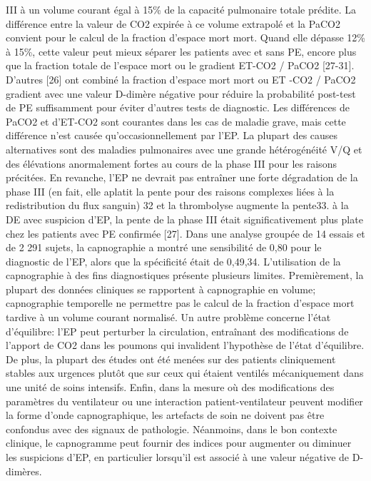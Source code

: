 \documentclass[12pt,]{article}
\begin{document}
\begin{itemize}
  III à un volume courant égal à 15\% de la capacité pulmonaire totale
  prédite. La différence entre la valeur de CO2 expirée à ce volume
  extrapolé et la PaCO2 convient pour le calcul de la fraction d'espace
  mort mort. Quand elle dépasse 12\% à 15\%, cette valeur peut mieux
  séparer les patients avec et sans PE, encore plus que la fraction
  totale de l'espace mort ou le gradient ET-CO2 / PaCO2 {[}27-31{]}.
  D'autres {[}26{]} ont combiné la fraction d'espace mort mort ou ET
  -CO2 / PaCO2 gradient avec une valeur D-dimère négative pour réduire
  la probabilité post-test de PE suffisamment pour éviter d'autres tests
  de diagnostic. Les différences de PaCO2 et d'ET-CO2 sont courantes
  dans les cas de maladie grave, mais cette différence n'est causée
  qu'occasionnellement par l'EP. La plupart des causes alternatives sont
  des maladies pulmonaires avec une grande hétérogénéité V/Q et des
  élévations anormalement fortes au cours de la phase III pour les
  raisons précitées. En revanche, l'EP ne devrait pas entraîner une
  forte dégradation de la phase III (en fait, elle aplatit la pente pour
  des raisons complexes liées à la redistribution du flux sanguin) 32 et
  la thrombolyse augmente la pente33. à la DE avec suspicion d'EP, la
  pente de la phase III était significativement plus plate chez les
  patients avec PE confirmée {[}27{]}. Dans une analyse groupée de 14
  essais et de 2 291 sujets, la capnographie a montré une sensibilité de
  0,80 pour le diagnostic de l'EP, alors que la spécificité était de
  0,49,34. L'utilisation de la capnographie à des fins diagnostiques
  présente plusieurs limites. Premièrement, la plupart des données
  cliniques se rapportent à capnographie en volume; capnographie
  temporelle ne permettre pas le calcul de la fraction d'espace mort
  tardive à un volume courant normalisé. Un autre problème concerne
  l'état d'équilibre: l'EP peut perturber la circulation, entraînant des
  modifications de l'apport de CO2 dans les poumons qui invalident
  l'hypothèse de l'état d'équilibre. De plus, la plupart des études ont
  été menées sur des patients cliniquement stables aux urgences plutôt
  que sur ceux qui étaient ventilés mécaniquement dans une unité de
  soins intensifs. Enfin, dans la mesure où des modifications des
  paramètres du ventilateur ou une interaction patient-ventilateur
  peuvent modifier la forme d'onde capnographique, les artefacts de soin
  ne doivent pas être confondus avec des signaux de pathologie.
  Néanmoins, dans le bon contexte clinique, le capnogramme peut fournir
  des indices pour augmenter ou diminuer les suspicions d'EP, en
  particulier lorsqu'il est associé à une valeur négative de D-dimères.
\end{itemize}
\end{document}
